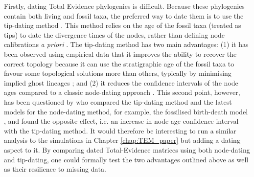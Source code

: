 Firstly, dating Total Evidence phylogenies is difficult. 
Because these phylogenies contain both living and fossil taxa, the preferred way to date them is to use the tip-dating method \citep[e.g.][]{ronquista2012,Wood01032013,Dembo2015}.
This method relies on the age of the fossil taxa (treated as tips) to date the divergence times of the nodes, rather than defining node calibrations \textit{a priori} \citep[cf. node-dating;][]{ronquista2012}.
The tip-dating method has two main advantages: (1) it has been observed using empirical data that it improves the ability to recover the correct topology because it can use the stratigraphic age of the fossil taxa to favour some topological solutions more than others, typically by minimising implied ghost lineages \citep[][and personal communications]{BEASTmaster}; and (2) it reduces the confidence intervals of the node ages compared to a classic node-dating approach \citep{ronquista2012}.
This second point, however, has been questioned by \cite{Arcila2015131} who compared the tip-dating method and the latest models for the node-dating method, for example, the fossilised birth-death model \citep{heaththe2013}, and found the opposite effect, i.e. an increase in node age confidence interval with the tip-dating method.
It would therefore be interesting to run a similar analysis to the simulations in Chapter \ref{chap:TEM_paper} but adding a dating aspect to it.
By comparing dated Total-Evidence matrices using both node-dating and tip-dating, one could formally test the two advantages outlined above as well as their resilience to missing data.

